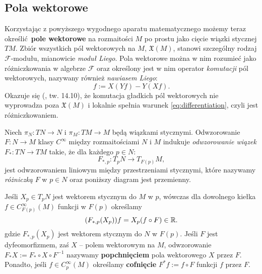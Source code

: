 \subsection{Pola wektorowe}
Korzystając z powyższego wygodnego aparatu matematycznego możemy teraz określić \textbf{pole wektorowe} na rozmaitości \(M\) po prostu jako cięcie wiązki stycznej \(TM\). Zbiór wszystkich pól wektorowych na \(M\), \(\mathfrak{X}(M)\), stanowi szczególny rodzaj \(\mathcal{F}\)-modułu, mianowicie \emph{moduł Liego}. Pola wektorowe można w nim rozumieć jako różniczkowania w algebrze \(\mathcal{F}\) oraz określony jest w nim operator \emph{komutacji} pól wektorowych, nazywany również \emph{nawiasem Liego}:
\begin{equation*}
    [X, Y]f := X(Yf) - Y(Xf).
\end{equation*}
Okazuje się (\cite{tu}, tw. 14.10), że komutacja gładkich pól wektorowych nie wyprowadza poza \(\mathfrak{X}(M)\) i lokalnie spełnia warunek \eqref{eq:differentiation}, czyli jest różniczkowaniem.

Niech \(\pi_N: TN \to N\) i \(\pi_M: TM \to M\) będą wiązkami stycznymi. Odwzorowanie \(F:N\to M\) klasy \(C^\infty\) między rozmaitościami \(N\) i \(M\) indukuje \emph{odwzorowanie wiązek} \(F_\ast: TN\to TM\) takie, że dla każdego \(p\in N\):
\begin{equation*}
F_{\ast, p}:T_p N\rightarrow T_{F(p)}M,
\end{equation*}
jest odwzorowaniem liniowym między przestrzeniami stycznymi, które nazywamy \emph{różniczką} \(F\) w \(p\in N\) oraz poniższy diagram jest przemienny.
\begin{figure}[!h]
\centering
{}
\end{figure}

Jeśli \(X_p\in T_p N\) jest wektorem stycznym do \(M\) w \(p\), wówczas dla dowolnego kiełka \(f\in C_{F(p)}^\infty(M)\) funkcji w \(F(p)\) określamy
\begin{equation*}
(F_{\ast, p} (X_p))f = X_p(f\circ F) \in \mathbb{R}.
\end{equation*}
gdzie \(F_{\ast, p} (X_p)\) jest wektorem stycznym do \(N\) w \(F(p)\). Jeśli \(F\) jest dyfeomorfizmem, zaś \(X\) -- polem wektorowym na \(M\), odwzorowanie \(F_\ast X := F_\ast \circ X \circ F^{-1}\) nazywamy \textbf{popchnięciem} pola wektorowego \(X\) przez \(F\). Ponadto, jeśli \(f\in C_p^\infty(M)\) określamy \textbf{cofnięcie} \(F^\ast f := f\circ F\) funkcji \(f\) przez \(F\).


